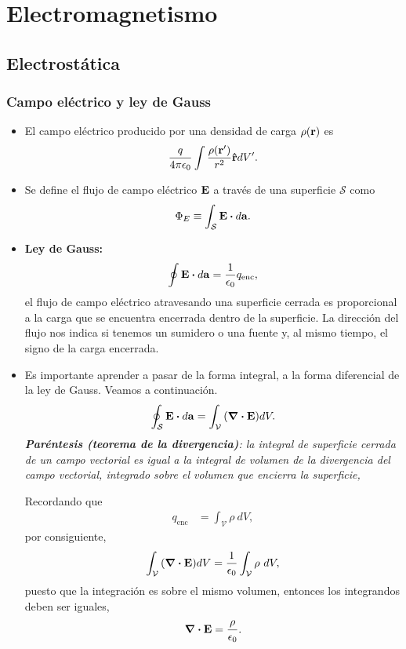 \chapter{Electromagnetismo}
\section{Electrostática}
\subsection{Campo eléctrico y ley de Gauss}
\begin{itemize}
\item El campo eléctrico producido por una densidad de carga $\rho(\vb{r})$
es
\begin{align}
\frac{q}{4\pi \epsilon_0}\int \frac{\rho(\vb{r}')}{r^2}\vb{\hat{r}}dV'.
\end{align}

\item Se define el flujo de campo eléctrico $\vb{E}$ a través de 
una superficie $\mathcal{S}$ como
\begin{align}
\Phi_E\equiv\int _{\mathcal{S}}\vb{E}\vdot d\vb{a}.
\end{align}

\item \textbf{Ley de Gauss:}
\begin{align}
\oint \vb{E}\vdot d\vb{a}=\frac{1}{\ep}q_{\text{enc}},
\end{align}
el flujo de campo eléctrico atravesando una superficie cerrada
es proporcional a la carga que se encuentra encerrada dentro 
de la superficie. La dirección del flujo nos indica si tenemos un 
sumidero o una fuente y, al mismo tiempo, el signo de la carga
encerrada.

\item Es importante aprender a pasar de la forma integral, a la forma
diferencial de la ley de Gauss. Veamos a continuación. 
\begin{align*}
\oint_{\mathcal{S}} \vb{E}\vdot d\vb{a}=\int_{\mathcal{V}}
\qty(\div{\vb{E}})dV.
\end{align*}
\textit{\textbf{Paréntesis (teorema de la divergencia)}: la integral 
de superficie cerrada de un campo vectorial es igual a la integral 
de volumen de la divergencia del campo vectorial, integrado sobre
el volumen que encierra la superficie,}

Recordando que 
\begin{align*}
q_{\text{enc}}&=\int_{\mathcal{V}}\rho \ dV,
\end{align*}
por consiguiente, 
\begin{align*}
\int_{\mathcal{V}}\qty(\div{\vb{E}})dV=
\frac{1}{\epsilon_0}\int_{\mathcal{V}}\rho \ dV,
\end{align*}
puesto que la integración es sobre el mismo volumen, entonces
los integrandos deben ser iguales,
\begin{align}
\div{\vb{E}}=\frac{\rho}{\epsilon_0}.
\end{align}


\end{itemize}
